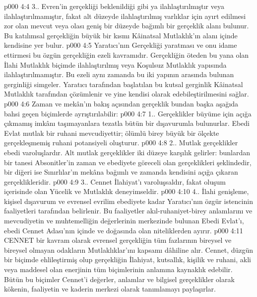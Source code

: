 \vs p000 4:4 3.\bibnobreakspace {}. Evren’in gerçekliği beklenildiği gibi ya ilahlaştırılmıştır veya ilahlaştırılmamıştır, fakat alt düzeyde ilahlaştırılmış varlıklar için ayırt edilmesi zor olan mevcut veya olası geniş bir düzeyde bağımlı bir gerçeklik alanı bulunur. Bu katılımsal gerçekliğin büyük bir kısmı Kâinatsal Mutlaklık’ın alanı içinde kendisine yer bulur.
\vs p000 4:5 Yaratıcı’nın Gerçekliği yaratması ve onu idame ettirmesi bu özgün gerçekliğin ezeli kavramıdır. Gerçekliğin öteden bu yana olan  İlahi Mutlaklık biçimde ilahlaştırılmış veya Koşulsuz Mutlaklık yapısında ilahlaştırılmamıştır. Bu ezeli  aynı zamanda bu iki yapının arasında bulunan gerginliği simgeler. Yaratıcı tarafından başlatılan bu kutsal gerginlik Kâinatsal Mutlaklık tarafından çözümlenir ve yine kendisi olarak edebileştirilmesini sağlar.
\vs p000 4:6 Zaman ve mekân’ın bakış açısından gerçeklik bundan başka aşağıda bahsi geçen biçimlerde ayrıştırılabilir:
\vs p000 4:7 1.\bibnobreakspace {}. Gerçeklikler büyüme için açığa çıkmamış imkânı taşımayanlara tezatla bütün bir dışavurumla bulunurlar. Ebedi Evlat mutlak bir ruhani mevcudiyettir; ölümlü birey büyük bir ölçekte gerçekleşmemiş ruhani potansiyeli oluşturur.
\vs p000 4:8 2.\bibnobreakspace {}. Mutlak gerçeklikler ebedi varoluşlardır. Alt mutlak gerçeklikler iki düzeye karşılık gelirler: bunlardan bir tanesi Absonitler’in zaman ve ebediyete göreceli olan gerçeklikleri şeklindedir, bir diğeri ise Sınırlılar’ın mekâna bağımlı ve zamanda kendisini açığa çıkaran gerçeklikleridir.
\vs p000 4:9 3.\bibnobreakspace {}. Cennet İlahiyat’ı varoluşsaldır, fakat oluşum içerisinde olan Yücelik ve Mutlaklık deneyimseldir.
\vs p000 4:10 4.\bibnobreakspace {}. İlahi genişleme, kişisel dışavurum ve evrensel evrilim ebediyete kadar Yaratıcı’nın özgür istencinin faaliyetleri tarafından belirlenir. Bu faaliyetler akıl\hyp{}ruhaniyet\hyp{}birey anlamlarını ve mevcudiyetin ve muhtemelliğin değerlerinin merkezinde bulunan Ebedi Evlat’ı, ebedi Cennet Adası’nın içinde ve doğasında olan niteliklerden ayırır.
\vs p000 4:11 CENNET bir kavram olarak evrensel gerçekliğin tüm fazlarının bireysel ve bireysel olmayan odakların Mutlaklıklar’ını kapsamı dâhiline alır. Cennet, düzgün bir biçimde ehlileştirmiş olup gerçekliğin İlahiyat, kutsallık, kişilik ve ruhani, akli veya maddesel olan enerjinin tüm biçimlerinin anlamına kaynaklık edebilir. Bütün bu biçimler Cennet’i değerler, anlamlar ve bilgisel gerçeklikler olarak kökenin, faaliyetin ve kaderin merkezi olarak tanımlamayı paylaşırlar.
